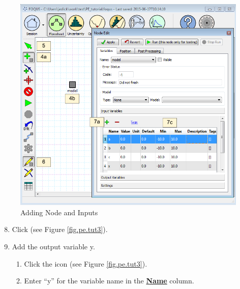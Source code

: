 \begin{figure}[H]
	\begin{center}
		\includegraphics[scale=0.55]{Chapt_optimization/figs/par_est_tut2}
		\caption{Adding Node and Inputs}
		\label{fig.pe.tut2}
	\end{center}
\end{figure}

\begin{enumerate}
	\setcounter{enumi}{7}
	\item Click  (see Figure \ref{fig.pe.tut3}).
	\item Add the output variable y.
	\begin{enumerate}
		\item Click the  icon (see Figure \ref{fig.pe.tut3}).
		\item Enter ``y'' for the variable name in the \textbf{\underline{Name}} column.
	\end{enumerate}
\end{enumerate}

